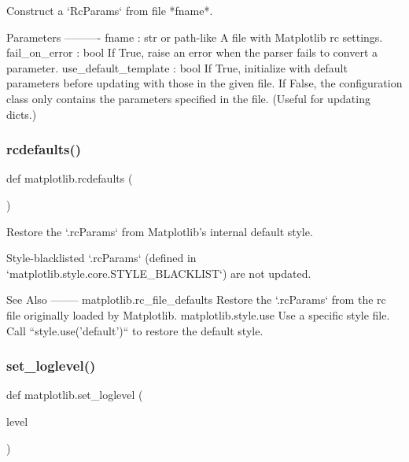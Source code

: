 \begin{DoxyVerb}Construct a `RcParams` from file *fname*.

Parameters
----------
fname : str or path-like
    A file with Matplotlib rc settings.
fail_on_error : bool
    If True, raise an error when the parser fails to convert a parameter.
use_default_template : bool
    If True, initialize with default parameters before updating with those
    in the given file. If False, the configuration class only contains the
    parameters specified in the file. (Useful for updating dicts.)
\end{DoxyVerb}
 \mbox{\label{namespacematplotlib_a28b1fc62c2abee97ce803d8238bacd67}} 
\subsubsection{\texorpdfstring{rcdefaults()}{rcdefaults()}}
{\footnotesize\ttfamily def matplotlib.\+rcdefaults (\begin{DoxyParamCaption}{ }\end{DoxyParamCaption})}

\begin{DoxyVerb}Restore the `.rcParams` from Matplotlib's internal default style.

Style-blacklisted `.rcParams` (defined in
`matplotlib.style.core.STYLE_BLACKLIST`) are not updated.

See Also
--------
matplotlib.rc_file_defaults
    Restore the `.rcParams` from the rc file originally loaded by
    Matplotlib.
matplotlib.style.use
    Use a specific style file.  Call ``style.use('default')`` to restore
    the default style.
\end{DoxyVerb}
 \mbox{\label{namespacematplotlib_a94c699cfaea1ae4b7804dda4ef2e42e3}} 
\subsubsection{\texorpdfstring{set\+\_\+loglevel()}{set\_loglevel()}}
{\footnotesize\ttfamily def matplotlib.\+set\+\_\+loglevel (\begin{DoxyParamCaption}\item[{}]{level }\end{DoxyParamCaption})}

